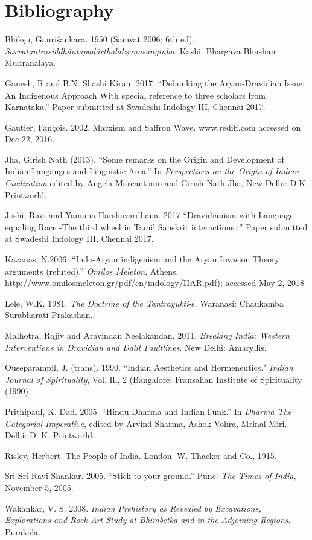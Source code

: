 \section*{Bibliography}

\begin{thebibliography}{99}
\itemsep=0pt
 Bhikşu, Gauriśankara. 1950 (Samvat 2006; 6th ed). \textit{Sarvatantrasiddhāntapadārthalakşaņasangraha}. Kashi: Bhargava Bhushan Mudranalaya.

  Ganesh, R and B.N. Shashi Kiran. 2017. “Debunking the Aryan-Dravidian Issue: An Indigenous Approach With special reference to three scholars from Karnataka.” Paper submitted at Swadeshi Indology III, Chennai 2017.

  Gautier, Fançois. 2002. Marxism and Saffron Wave. www.rediff.com accessed on Dec 22, 2016. 

  Jha, Girish Nath (2013), “Some remarks on the Origin and Development of Indian Langauges and Linguistic Area.” In \textit{Perspectives on the Origin of Indian Civilization} edited by Angela Marcantonio and Girish Nath Jha, New Delhi: D.K. Printworld.

  Joshi, Ravi and Yamuna Harshavardhana. 2017 “Dravidianism with Language equaling Race -The third wheel in Tamil Sanskrit interactions.:” Paper submitted at Swadeshi Indology III, Chennai 2017.

  Kazanas, N.2006. “Indo-Aryan indigenism and the Aryan Invasion Theory arguments (refuted).” \textit{Omilos Meleton}, Athens. \url{http://www.omilosmeleton.gr/pdf/en/indology/IIAR.pdf}); accessed May 2, 2018

  Lele, W.K. 1981. \textit{The Doctrine of the Tantrayukti}-s. Waranasi: Chaukamba Surabharati Prakashan.

  Malhotra, Rajiv and Aravindan Neelakandan. 2011. \textit{Breaking India: Western Interventions in Dravidian and Dalit Faultlines}. New Delhi: Amaryllis.

  Ouseparampil, J. (trans). 1990. “Indian Aesthetics and Hermeneutics." \textit{Indian Journal of Spirituality}, Vol. Ill, 2 (Bangalore: Fransalian Institute of Spirituality (1990).

  Prithipaul, K. Dad. 2005. “Hindu Dharma and Indian Funk.” In \textit{Dharma The Categorial Imperative}, edited by Arvind Sharma, Ashok Vohra, Mrinal Miri. Delhi: D. K. Printworld.

  Risley, Herbert. The People of India. London. W. Thacker and Co., 1915.

  Sri Sri Ravi Shankar. 2005. “Stick to your ground.” Pune: \textit{The Times of India}, November 5, 2005.

  Wakankar, V. S. 2008. \textit{Indian Prehistory as Revealed by Excavations, Explorations and Rock Art Study at Bhimbetka and in the Adjoining Regions}. Purakala. 

 \end{thebibliography}

